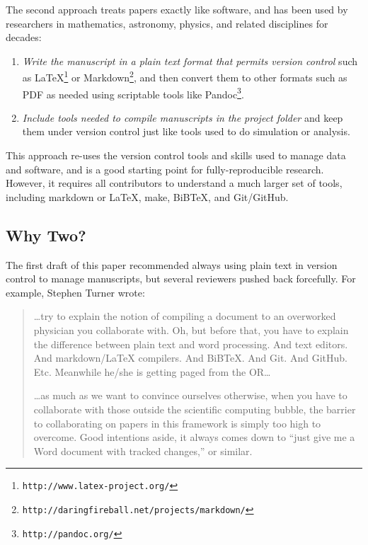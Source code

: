 \documentclass[10pt]{article}
\newcommand{\recommend}[1]{\textit{#1}}
\newcommand{\withurl}[2]{{#1}\footnote{\texttt{#2}}}
\begin{document}
The second approach treats papers exactly like software, and has been
used by researchers in mathematics, astronomy, physics, and related
disciplines for decades:

\begin{enumerate}

\item
  \recommend{Write the manuscript in a plain text format that permits
    version control} such as
  \withurl{LaTeX}{http://www.latex-project.org/} or
  \withurl{Markdown}{http://daringfireball.net/projects/markdown/},
  and then convert them to other formats such as PDF as needed using
  scriptable tools like \withurl{Pandoc}{http://pandoc.org/}.

\item
  \recommend{Include tools needed to compile manuscripts in the project
  folder} and keep them under version control just like tools used to
  do simulation or analysis.

\end{enumerate}

This approach re-uses the version control tools and skills used to
manage data and software, and is a good starting point for
fully-reproducible research. However, it requires all contributors to
understand a much larger set of tools, including markdown or LaTeX,
make, BiBTeX, and Git/GitHub.

\subsection*{Why Two?}

The first draft of this paper recommended always using plain text in
version control to manage manuscripts, but several reviewers pushed
back forcefully. For example, Stephen Turner wrote:

\begin{quote}
{\ldots}try to explain the notion of compiling a document to an
overworked physician you collaborate with. Oh, but before that, you have
to explain the difference between plain text and word processing. And
text editors. And markdown/LaTeX compilers. And BiBTeX. And Git. And
GitHub. Etc. Meanwhile he/she is getting paged from the OR{\ldots}

{\ldots}as much as we want to convince ourselves otherwise, when you
have to collaborate with those outside the scientific computing bubble,
the barrier to collaborating on papers in this framework is simply too
high to overcome. Good intentions aside, it always comes down to ``just
give me a Word document with tracked changes,'' or similar.
\end{quote}
\end{document}
